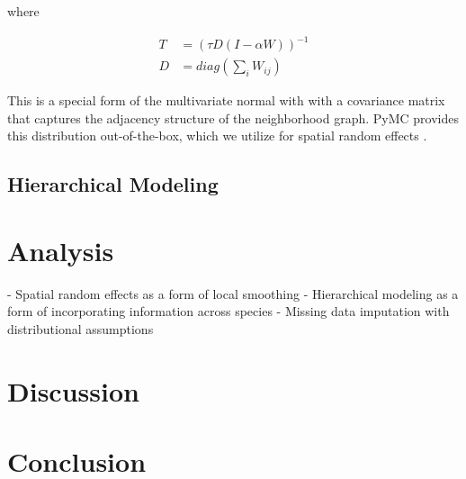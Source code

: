 \documentclass[notitlepage]{article}
\begin{document}
where

\begin{equation}
\begin{aligned}
    T &= (\tau D (I-\alpha W))^{-1} \\
    D &= diag(\sum_{i} W_{ij})
\end{aligned}
\end{equation}


This is a special form of the multivariate normal with with a covariance matrix that captures the adjacency structure of the neighborhood graph. 
PyMC provides this distribution out-of-the-box, which we utilize for spatial random effects \cite{salvatier_probabilistic_2016}.


\subsection{Hierarchical Modeling}

\section{Analysis}

- Spatial random effects as a form of local smoothing
- Hierarchical modeling as a form of incorporating information across species
- Missing data imputation with distributional assumptions

\section{Discussion}

\section{Conclusion}

\printbibliography
\end{document}
